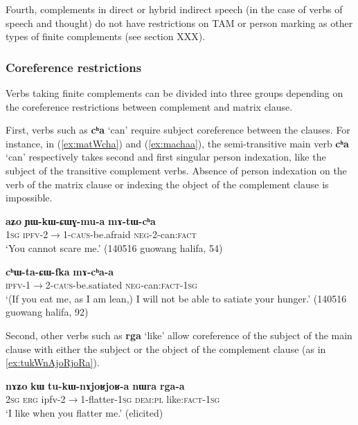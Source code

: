 \documentclass[oneside,a4paper,11pt]{article}
\newcommand{\ipa}[1]{\textbf{\phon#1}} %
\newcommand{\jpg}[2]{\ipa{#1} `#2'} %
\begin{document}
Fourth, complements in direct or hybrid indirect speech (in the case of verbs of speech and thought) do not have restrictions on TAM or person marking as other types of finite complements (see section XXX).

\subsubsection{Coreference restrictions} \label{sec:finitie.coref}
Verbs taking finite complements can be divided into three groups depending on the coreference restrictions between complement and matrix clause.

First, verbs such as \jpg{cʰa}{can} require subject coreference between the clauses. For instance, in (\ref{ex:matWcha}) and (\ref{ex:machaa}), the semi-transitive main verb \jpg{cʰa}{can} respectively takes second and first singular person indexation, like the subject of the transitive complement verbs. Absence of person indexation on the verb of the matrix clause or indexing the object of the complement clause is impossible.

\begin{exe}
\ex \label{ex:matWcha}
\gll \ipa{aʑo} 	\ipa{ɲɯ-kɯ-ɕɯɣ-mu-a} 	\ipa{mɤ-tɯ-cʰa} \\
\textsc{1sg} \textsc{ipfv-2$\rightarrow$1-caus}-be.afraid \textsc{neg}-2-can:\textsc{fact} \\
\glt `You cannot scare me.' (140516 guowang halifa, 54)
\end{exe}

\begin{exe}
\ex \label{ex:machaa}
\gll
\ipa{cʰɯ-ta-ɕɯ-fka} 	\ipa{mɤ-cʰa-a} \\
\textsc{ipfv-1$\rightarrow$2-caus}-be.satiated \textsc{neg}-can:\textsc{fact-1sg} \\
\glt `(If you eat me, as I am lean,) I will not be able to satiate your hunger.' (140516 guowang halifa, 92)
\end{exe}

Second, other verbs such as \jpg{rga}{like} allow coreference of the subject of the main clause with either the subject or the object of the complement clause (as in \ref{ex:tukWnAjoRjoRa}).

\begin{exe}
\ex \label{ex:tukWnAjoRjoRa}
\gll \ipa{nɤʑo} \ipa{kɯ} \ipa{tu-kɯ-nɤjoʁjoʁ-a} \ipa{nɯra}	\ipa{rga-a} \\
\textsc{2sg} \textsc{erg} ipfv-2$\rightarrow$1-flatter-\textsc{1sg} \textsc{dem:pl} like:\textsc{fact-1sg} \\
\glt `I like when you flatter me.' (elicited)
\end{exe}
\end{document}

